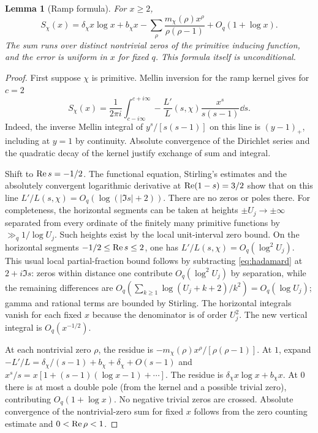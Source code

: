 \documentclass[11pt]{article}
\newtheorem{lemma}[theorem]{Lemma}
\begin{document}
\begin{lemma}[Ramp formula]\label{lem:ramp}
For $x\ge2$,
\begin{equation}\label{eq:explicit}
 S_\chi(x)=\delta_\chi x\log x+b_\chi x-
 \sum_\rho \frac{m_\chi(\rho)x^\rho}{\rho(\rho-1)}+O_q(1+\log x).
\end{equation}
The sum runs over distinct nontrivial zeros of the primitive inducing function, and the error is uniform in $x$ for fixed $q$. This formula itself is unconditional.
\end{lemma}
\begin{proof}
First suppose $\chi$ is primitive. Mellin inversion for the ramp kernel gives for $c=2$
\[
 S_\chi(x)=\frac{1}{2\pi i}\int_{c-i\infty}^{c+i\infty}
 -\frac{L'}{L}(s,\chi)\frac{x^s}{s(s-1)}\dd s.
\]
Indeed, the inverse Mellin integral of $y^s/[s(s-1)]$ on this line is $(y-1)_+$, including at $y=1$ by continuity. Absolute convergence of the Dirichlet series and the quadratic decay of the kernel justify exchange of sum and integral.

Shift to $\operatorname{Re} s=-1/2$. The functional equation, Stirling's estimates and the absolutely convergent logarithmic derivative at $\operatorname{Re}(1-s)=3/2$ show that on this line $L'/L(s,\chi)=O_q(\log(|\Im s|+2))$. There are no zeros or poles there. For completeness, the horizontal segments can be taken at heights $\pm U_j\to\pm\infty$ separated from every ordinate of the finitely many primitive functions by $\gg_q 1/\log U_j$. Such heights exist by the local unit-interval zero bound. On the horizontal segments $-1/2\le\operatorname{Re} s\le2$, one has $L'/L(s,\chi)=O_q(\log^2 U_j)$. This usual local partial-fraction bound follows by subtracting \eqref{eq:hadamard} at $2+i\Im s$: zeros within distance one contribute $O_q(\log^2 U_j)$ by separation, while the remaining differences are $O_q(\sum_{k\ge1}\log(U_j+k+2)/k^2)=O_q(\log U_j)$; gamma and rational terms are bounded by Stirling. The horizontal integrals vanish for each fixed $x$ because the denominator is of order $U_j^2$. The new vertical integral is $O_q(x^{-1/2})$.

At each nontrivial zero $\rho$, the residue is $-m_\chi(\rho)x^\rho/[\rho(\rho-1)]$. At $1$, expand $-L'/L=\delta_\chi/(s-1)+b_\chi+\delta_\chi+O(s-1)$ and $x^s/s=x[1+(s-1)(\log x-1)+\cdots]$. The residue is $\delta_\chi x\log x+b_\chi x$. At $0$ there is at most a double pole (from the kernel and a possible trivial zero), contributing $O_q(1+\log x)$. No negative trivial zeros are crossed. Absolute convergence of the nontrivial-zero sum for fixed $x$ follows from the zero counting estimate and $0<\operatorname{Re}\rho<1$.


\end{proof}
\end{document}
